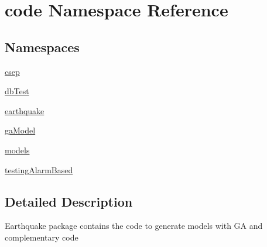 \hypertarget{namespacecode}{}\section{code Namespace Reference}
\label{namespacecode}
\subsection*{Namespaces}
\begin{DoxyCompactItemize}
\item 
 \hyperlink{namespacecode_1_1csep}{csep}
\item 
 \hyperlink{namespacecode_1_1db_test}{db\+Test}
\item 
 \hyperlink{namespacecode_1_1earthquake}{earthquake}
\item 
 \hyperlink{namespacecode_1_1ga_model}{ga\+Model}
\item 
 \hyperlink{namespacecode_1_1models}{models}
\item 
 \hyperlink{namespacecode_1_1testing_alarm_based}{testing\+Alarm\+Based}
\end{DoxyCompactItemize}


\subsection{Detailed Description}
\begin{DoxyVerb}Earthquake package contains the code to generate models with GA and complementary code
\end{DoxyVerb}
 